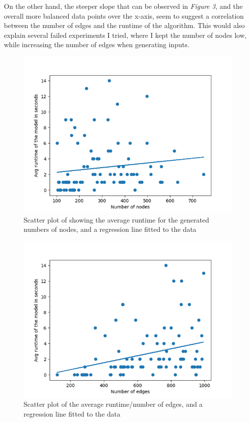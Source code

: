 \documentclass{article}
\begin{document}
On the other hand, the steeper slope that can be observed in \textit{Figure 3}, and the overall more balanced data points over the x-axis, seem to suggest 
a correlation between the number of edges and the runtime of the algorithm. This would also explain several failed experiments I tried, where I kept the number of nodes low, while increasing the number of edges when generating inputs. 


\begin{figure}[h]
    \centering 
    \includegraphics[width=0.8\linewidth]{../images/figure3.png}
    \caption{Scatter plot of showing the average runtime for the generated numbers of nodes, and a regression line fitted to the data}
\end{figure}

\begin{figure}[h]
    \centering 
    \includegraphics[width=0.8\linewidth]{../images/figure2.png}
    \caption{Scatter plot of the average runtime/number of edges, and a regression line fitted to the data}
\end{figure}
\end{document}
